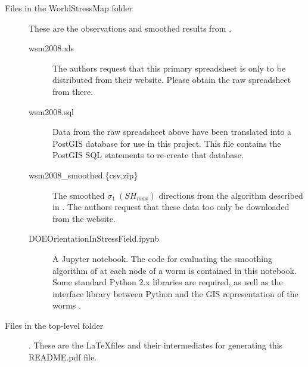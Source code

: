 \documentclass[extra]{article}
\begin{document}
\begin{description}
\item[Files in the WorldStressMap folder] These are the observations and smoothed results from \citet{WSMDatabase08,HeidbachEtAl10}. 
\begin{description}
\item[wsm2008.xls] The authors \citep{WSMDatabase08} request that this primary spreadsheet is only to be distributed from their website. Please obtain the raw spreadsheet from there.
\item[wsm2008.sql] Data from the raw spreadsheet above have been translated into a PostGIS database for use in this project. This file contains the PostGIS SQL statements to re-create that database.
\item[wsm2008\_smoothed.\{csv,zip\}] The smoothed \(\sigma_1 \ (SH_{max})\) directions from the algorithm described in \citet{HeidbachEtAl10}. The authors request that these data too only be downloaded from the \citet{WSMDatabase08} website.
\item[DOEOrientationInStressField.ipynb] A Jupyter \citep[formerly IPython: ][]{PerezGranger07} notebook. The code for evaluating the smoothing algorithm of \citet{HeidbachEtAl10} at each node of a worm is contained in this notebook. Some standard Python 2.x libraries are required, as well as the interface library between Python and the GIS representation of the worms \citep[found in the git repository: ][]{WormDBStuff}.
\end{description}
\item[Files in the top-level folder]. These are the \LaTeX files and their intermediates for generating this README.pdf file.
\end{description}





%

\end{document}
